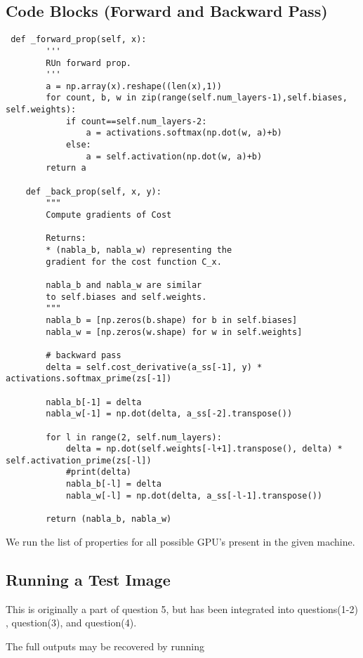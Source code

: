 \subsection {Code Blocks (Forward and Backward Pass)}
\begin{lstlisting}
 def _forward_prop(self, x):
        '''
        RUn forward prop.
        '''
        a = np.array(x).reshape((len(x),1))
        for count, b, w in zip(range(self.num_layers-1),self.biases, self.weights):
            if count==self.num_layers-2:
                a = activations.softmax(np.dot(w, a)+b)
            else:
                a = self.activation(np.dot(w, a)+b)
        return a

    def _back_prop(self, x, y):
        """
        Compute gradients of Cost
        
        Returns:
        * (nabla_b, nabla_w) representing the
        gradient for the cost function C_x.  
        
        nabla_b and nabla_w are similar
        to self.biases and self.weights.
        """
        nabla_b = [np.zeros(b.shape) for b in self.biases]
        nabla_w = [np.zeros(w.shape) for w in self.weights]

        # backward pass
        delta = self.cost_derivative(a_ss[-1], y) * activations.softmax_prime(zs[-1])

        nabla_b[-1] = delta
        nabla_w[-1] = np.dot(delta, a_ss[-2].transpose())
        
        for l in range(2, self.num_layers):
            delta = np.dot(self.weights[-l+1].transpose(), delta) * self.activation_prime(zs[-l])
            #print(delta)
            nabla_b[-l] = delta
            nabla_w[-l] = np.dot(delta, a_ss[-l-1].transpose())

        return (nabla_b, nabla_w)
\end{lstlisting}

We run the list of properties for all possible GPU's present in the given machine.

\bigskip
\newpage

\subsection{Running a Test Image}

This is originally a part of question 5, but has been integrated into questions(1-2) , question(3), and question(4).

The full outputs may be recovered by running

